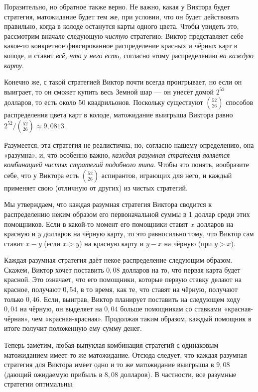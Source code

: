 Поразительно, но обратное также верно.
Не важно, какая у Виктора будет стратегия, матожидание будет тем же, при условии, что он будет действовать правильно, когда в колоде останутся карты одного цвета.
Чтобы увидеть это, рассмотрим вначале следующую \emph{чистую} стратегию: Виктор представляет себе какое-то конкретное фиксированное распределение красных и чёрных карт в колоде, и ставит \emph{всё, что у него есть,} согласно этому распределению \emph{на каждую карту}.

Конечно же, с такой стратегией Виктор почти всегда проигрывает, но если он выиграет, то он сможет купить весь Земной шар --- он унесёт домой $2^{52}$ долларов, то есть около 50 квадрильонов.
Поскольку существуют $\binom{52}{26}$ способов распределения цвета карт в колоде, матожидание выигрыша Виктора равно $2^{52}/\binom{52}{26} \approx 9{,}0813$.

Разумеется, эта стратегия не реалистична, но, согласно нашему определению, она «разумна», и, что особенно важно, \emph{каждая разумная стратегия является комбинацией чистых стратегий подобного типа}.
Чтобы это понять, вообразите себе, что у Виктора есть $\binom{52}{26}$ аспирантов, играющих для него, и каждый применяет свою (отличную от других) из чистых стратегий.

Мы утверждаем, что каждая разумная стратегия Виктора сводится к распределению неким образом его первоначальной суммы в 1 доллар среди этих помощников.
Если в какой-то момент его помощники ставят $x$ долларов на красную и $y$ долларов на чёрную карту, то это равносильно тому, что Виктор сам ставит $x-y$ (если $x > y$) на красную карту и $y-x$ на чёрную (при $y>x$).

Каждая разумная стратегия даёт некое распределение следующим образом.
Скажем, Виктор хочет поставить $0{,}08$ долларов на то, что первая карта будет красной.
Это означает, что его помощники, которые первую ставку делают на красное, получают $0{,}54$, в то время, как те, что ставят на чёрную, получают только $0{,}46$.
Если, выиграв, Виктор планирует поставить на следующем ходу $0{,}04$ на чёрную, он выделяет на $0{,}04$ больше помощникам со ставками «красная-чёрная», чем «красная-красная».
Продолжая таким образом, каждый помощник в итоге получит положенную ему сумму денег.

Теперь заметим, любая выпуклая комбинация стратегий с одинаковым матожиданием имеет то же матожидание.
Отсюда следует, что каждая разумная стратегия для Виктора имеет одно и то же матожидание выигрыша в $9{,}08$ (дающий ожидаемую прибыль в $8{,}08$ долларов).
В частности, все разумные стратегии оптимальны.

